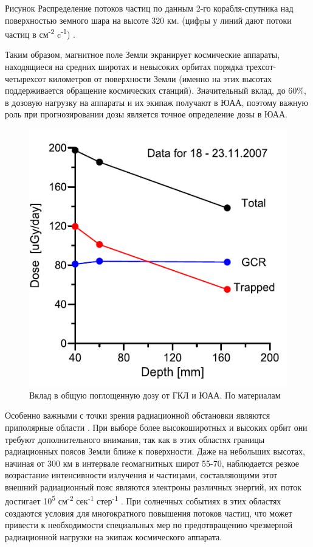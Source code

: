 

Рисунок Распределение потоков частиц по данным 2-го корабля-спутника над поверхностью земного шара на высоте 320 км. (цифpы у линий дают потоки частиц в см\textsuperscript{-2} c\textsuperscript{-1}) \cite{logachev2007}.


Таким образом, магнитное поле Земли экранирует космические аппараты, находящиеся на средних широтах и невысоких орбитах порядка трехсот-четырехсот километров от поверхности Земли (именно на этих высотах поддерживается обращение космических станций). Значительный вклад, до 60\%,  в дозовую нагрузку на аппараты и их экипаж получают в ЮАА, поэтому важную роль  при прогнозировании дозы является точное определение дозы в ЮАА\cite{lish2014, Lishnevskii2012}.

\begin{figure}
	\centering
	\includegraphics[width=0.7\linewidth]{images/liulinGCRSAA}
	\caption{Вклад в общую поглощенную дозу от ГКЛ и ЮАА. По материалам  \cite{Dachev2015}}
	\label{fig:liulingcrsaa}
\end{figure}

Особенно важными с точки зрения радиационной обстановки являются приполярные области \cite{gorchakov1961}. При выборе более высокоширотных и высоких орбит они требуют дополнительного внимания, так как в этих областях границы радиационных поясов Земли ближе к поверхности. Даже на небольших высотах, начиная от 300 км в интервале геомагнитных широт 55-70, наблюдается резкое возрастание интенсивности излучения и частицами, составляющими этот внешний радиационный пояс являются электроны различных энергий, их поток достигает 10\textsuperscript{5} см\textsuperscript{-2} сек\textsuperscript{-1} стер\textsuperscript{-1} \cite{vernov1960}. При солнечных событиях в этих областях создаются условия для многократного повышения потоков частиц, что может привести к необходимости специальных мер по предотвращению чрезмерной радиационной нагрузки на экипаж космического аппарата.

